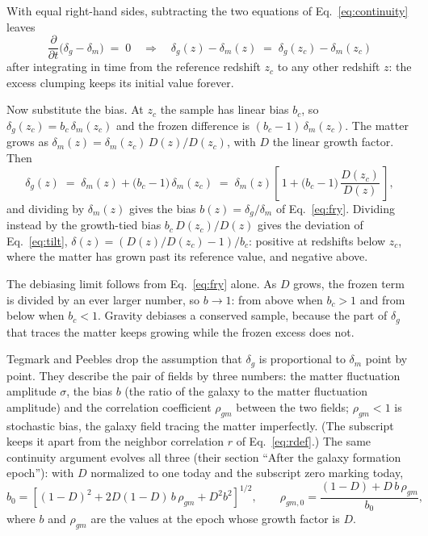 \documentclass[11pt]{article}
\begin{document}
With equal right-hand sides, subtracting the two equations of
Eq.~\eqref{eq:continuity} leaves
\begin{equation}
  \frac{\partial}{\partial t}\bigl(\delta_g - \delta_m\bigr) \;=\; 0
  \quad\Longrightarrow\quad
  \delta_g(z) - \delta_m(z)
  \;=\;
  \delta_g(z_c) - \delta_m(z_c)
  \label{eq:frozen}
\end{equation}
after integrating in time from the reference redshift $z_c$ to any
other redshift $z$: the excess clumping keeps its initial value
forever.

Now substitute the bias.  At $z_c$ the sample has linear bias $b_c$,
so $\delta_g(z_c) = b_c\,\delta_m(z_c)$ and the frozen difference is
$(b_c - 1)\,\delta_m(z_c)$.  The matter grows as
$\delta_m(z) = \delta_m(z_c)\, D(z)/D(z_c)$, with $D$ the linear
growth factor.  Then
\begin{equation}
  \delta_g(z)
  \;=\;
  \delta_m(z) + \bigl(b_c - 1\bigr)\,\delta_m(z_c)
  \;=\;
  \delta_m(z)
  \left[\,1 + \bigl(b_c - 1\bigr)\,\frac{D(z_c)}{D(z)}\,\right],
  \label{eq:appsub}
\end{equation}
and dividing by $\delta_m(z)$ gives the bias
$b(z) = \delta_g/\delta_m$ of Eq.~\eqref{eq:fry}.  Dividing instead
by the growth-tied bias $b_c\,D(z_c)/D(z)$ gives the deviation of
Eq.~\eqref{eq:tilt}, $\delta(z) = (D(z)/D(z_c) - 1)/b_c$: positive at
redshifts below $z_c$, where the matter has grown past its reference
value, and negative above.

The debiasing limit follows from Eq.~\eqref{eq:fry} alone.  As $D$
grows, the frozen term is divided by an ever larger number, so
$b \to 1$: from above when $b_c > 1$ and from below when $b_c < 1$.
Gravity debiases a conserved sample, because the part of $\delta_g$
that traces the matter keeps growing while the frozen excess does
not.

Tegmark and Peebles drop the assumption that $\delta_g$ is
proportional to $\delta_m$ point by point.  They describe the pair of
fields by three numbers: the matter fluctuation amplitude $\sigma$,
the bias $b$ (the ratio of the galaxy to the matter fluctuation
amplitude) and the correlation coefficient $\rho_{gm}$ between the
two fields; $\rho_{gm} < 1$ is stochastic bias, the galaxy field
tracing the matter imperfectly.  (The subscript keeps it apart from
the neighbor correlation $r$ of Eq.~\eqref{eq:rdef}.)  The same continuity argument evolves all three (their
section ``After the galaxy formation epoch''): with $D$ normalized to
one today and the subscript zero marking today,
\begin{equation}
  b_0 =
  \left[(1 - D)^2 + 2 D (1 - D)\, b\, \rho_{gm}
  + D^2 b^2\right]^{1/2},
  \qquad
  \rho_{gm,0} = \frac{(1 - D) + D\, b\, \rho_{gm}}{b_0},
  \label{eq:tpevol}
\end{equation}
where $b$ and $\rho_{gm}$ are the values at the epoch whose growth
factor is $D$.
\end{document}
